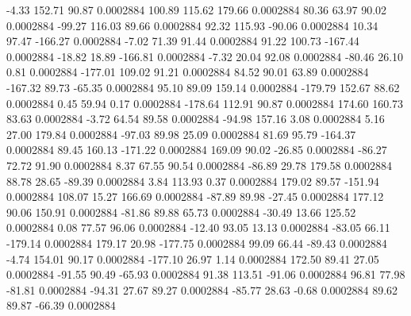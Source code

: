        -4.33      152.71       90.87     0.0002884
      100.89      115.62      179.66     0.0002884
       80.36       63.97       90.02     0.0002884
      -99.27      116.03       89.66     0.0002884
       92.32      115.93      -90.06     0.0002884
       10.34       97.47     -166.27     0.0002884
       -7.02       71.39       91.44     0.0002884
       91.22      100.73     -167.44     0.0002884
      -18.82       18.89     -166.81     0.0002884
       -7.32       20.04       92.08     0.0002884
      -80.46       26.10        0.81     0.0002884
     -177.01      109.02       91.21     0.0002884
       84.52       90.01       63.89     0.0002884
     -167.32       89.73      -65.35     0.0002884
       95.10       89.09      159.14     0.0002884
     -179.79      152.67       88.62     0.0002884
        0.45       59.94        0.17     0.0002884
     -178.64      112.91       90.87     0.0002884
      174.60      160.73       83.63     0.0002884
       -3.72       64.54       89.58     0.0002884
      -94.98      157.16        3.08     0.0002884
        5.16       27.00      179.84     0.0002884
      -97.03       89.98       25.09     0.0002884
       81.69       95.79     -164.37     0.0002884
       89.45      160.13     -171.22     0.0002884
      169.09       90.02      -26.85     0.0002884
      -86.27       72.72       91.90     0.0002884
        8.37       67.55       90.54     0.0002884
      -86.89       29.78      179.58     0.0002884
       88.78       28.65      -89.39     0.0002884
        3.84      113.93        0.37     0.0002884
      179.02       89.57     -151.94     0.0002884
      108.07       15.27      166.69     0.0002884
      -87.89       89.98      -27.45     0.0002884
      177.12       90.06      150.91     0.0002884
      -81.86       89.88       65.73     0.0002884
      -30.49       13.66      125.52     0.0002884
        0.08       77.57       96.06     0.0002884
      -12.40       93.05       13.13     0.0002884
      -83.05       66.11     -179.14     0.0002884
      179.17       20.98     -177.75     0.0002884
       99.09       66.44      -89.43     0.0002884
       -4.74      154.01       90.17     0.0002884
     -177.10       26.97        1.14     0.0002884
      172.50       89.41       27.05     0.0002884
      -91.55       90.49      -65.93     0.0002884
       91.38      113.51      -91.06     0.0002884
       96.81       77.98      -81.81     0.0002884
      -94.31       27.67       89.27     0.0002884
      -85.77       28.63       -0.68     0.0002884
       89.62       89.87      -66.39     0.0002884
